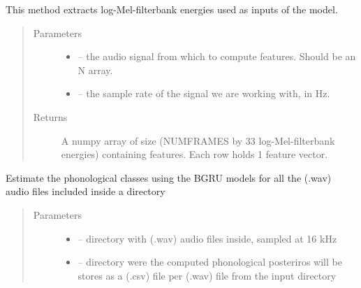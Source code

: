 \documentclass[letterpaper,10pt,english]{sphinxmanual}
\begin{document}
\begin{fulllineitems}

\begin{fulllineitems}
\label{\detokenize{index:phonet.Phonet.get_feat}}
This method extracts log-Mel-filterbank energies used as inputs
of the model.
\begin{quote}\begin{description}
\item[{Parameters}] \leavevmode\begin{itemize}
\item {} 
 -- the audio signal from which to compute features. Should be an N array.

\item {} 
 -- the sample rate of the signal we are working with, in Hz.

\end{itemize}

\item[{Returns}] \leavevmode
A numpy array of size (NUMFRAMES by 33 log-Mel-filterbank energies) containing features. Each row holds 1 feature vector.

\end{description}\end{quote}

\end{fulllineitems}


\begin{fulllineitems}
\label{\detokenize{index:phonet.Phonet.get_phon_path}}
Estimate the phonological classes using the BGRU models for all the (.wav) audio files included inside a directory
\begin{quote}\begin{description}
\item[{Parameters}] \leavevmode\begin{itemize}
\item {} 
 -- directory with (.wav) audio files inside, sampled at 16 kHz

\item {} 
 -- directory were the computed phonological posteriros will be stores as a (.csv) file per (.wav) file from the input directory


\end{itemize}
\end{description}
\end{quote}
\end{fulllineitems}
\end{fulllineitems}
\end{document}
